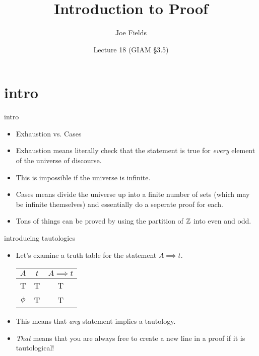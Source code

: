 \documentclass[landscape]{beamer}
\author{Joe Fields}
\title{Introduction to Proof}
\date{Lecture 18 (GIAM \S 3.5)}
\institute[SCSU]{ {\tt fieldsj1@southernct.edu} }
\begin{document}
\begin{frame}[plain]
  \titlepage
\end{frame}

\section{intro}

\begin{frame}{intro}
\begin{itemize}
\item Exhaustion vs. Cases \pause
\item Exhaustion means literally check that the statement is true for {\em every} element of the universe of discourse. \pause
\item This is impossible if the universe is infinite. \pause
\item Cases means divide the universe up into a finite number of sets (which may be infinite themselves) and essentially do a seperate proof for each.\pause
\item Tons of things can be proved by using the partition of ${\mathbb Z}$ into even and odd.
\end{itemize}
\end{frame}

\begin{frame}{introducing tautologies}
\begin{itemize}
\item Let's examine a truth table for the statement $A \implies t$. \pause

\begin{center}
\begin{tabular}{c|c|c}
$A$  & $t$ & $A \implies t$ \\ \hline
T & T & T \\
$\phi$ & T & T \\
\end{tabular}
\end{center}
\pause

\item This means that {\em any} statement implies a tautology. \pause
\item {\em That} means that you are always free to create a new line in a proof if it is tautological! 
\end{itemize}
\end{frame}
\end{document}

